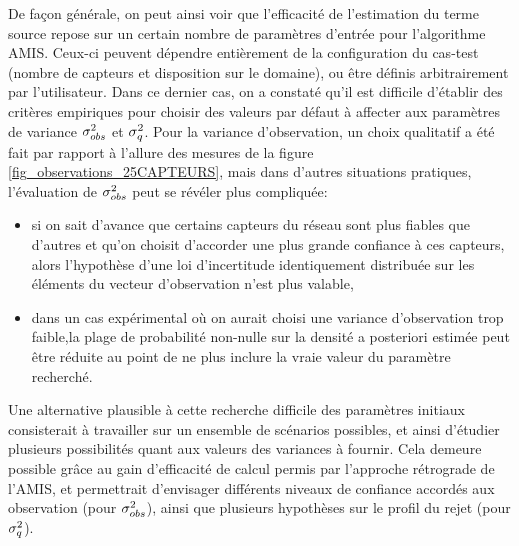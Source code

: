 De façon générale, on peut ainsi voir que l'efficacité de l'estimation du terme source repose sur un certain nombre de paramètres d'entrée pour l'algorithme AMIS. Ceux-ci peuvent dépendre entièrement de la configuration du cas-test (nombre de capteurs et disposition sur le domaine), ou être définis {arbitrairement} par l'utilisateur. Dans ce dernier cas, on a constaté qu'il est difficile d'établir des critères empiriques pour choisir des valeurs par défaut à affecter aux paramètres de variance ${\sigma_{obs}^2}$ et $\sigma_q^2$. Pour la variance d'observation, un choix qualitatif a été fait par rapport à l'allure des mesures de la figure \ref{fig_observations_25CAPTEURS}, mais dans d'autres situations pratiques, l'évaluation de ${\sigma_{obs}^2}$ peut se révéler plus compliquée:
\begin{itemize}
	\item si on sait d'avance que certains capteurs du réseau sont plus fiables que d'autres et qu'on choisit d'accorder une plus grande confiance à ces capteurs, alors l'hypothèse d'une loi d'incertitude identiquement distribuée sur les éléments du vecteur d'observation n'est plus valable,
	\item dans un cas expérimental où on aurait choisi une variance d'observation trop faible,{la plage de probabilité non-nulle sur la densité a posteriori estimée peut être réduite au point de ne plus inclure la vraie valeur du paramètre recherché.}
\end{itemize}

Une alternative plausible à cette recherche difficile des paramètres initiaux consisterait à travailler sur un ensemble de scénarios possibles, et ainsi d'étudier plusieurs possibilités quant aux valeurs des variances à fournir. Cela demeure possible grâce au gain d'efficacité de calcul permis par l'approche {rétrograde} de l'AMIS, et permettrait d'envisager différents niveaux de confiance accordés aux observation (pour ${\sigma_{obs}^2}$), ainsi que plusieurs hypothèses sur le profil du rejet (pour $\sigma_q^2$). 



 
 
 




